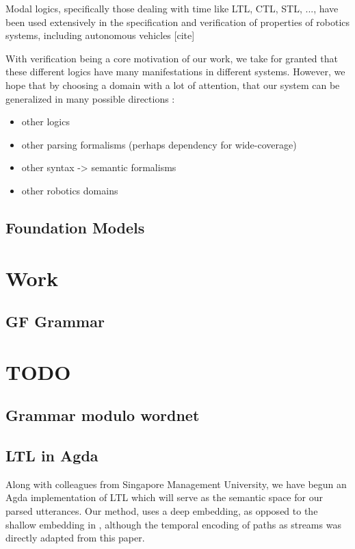 \documentclass[a4paper, 11pt]{article}
\begin{document}
Modal logics, specifically those dealing with time like LTL, CTL, STL, ..., have
been used extensively in the specification and verification of properties of
robotics systems, including autonomous vehicles [cite]

With verification being a core motivation of our work, we take for granted that
these different logics have many manifestations in different systems. However,
we hope that by choosing a domain with a lot of attention, that our system can
be generalized in many possible directions :

\begin{itemize}
\item other logics
\item other parsing formalisms (perhaps dependency for wide-coverage)
\item other syntax -> semantic formalisms
\item other robotics domains
\end{itemize}




\subsection{Foundation Models}

\section{Work} 

\subsection{GF Grammar}

\section{TODO} 

\subsection{Grammar modulo wordnet}

\subsection{LTL in Agda}

Along with colleagues from Singapore Management University, we have begun an
Agda implementation \cite{wltl} of LTL which will serve as the semantic space
for our parsed utterances. Our method, uses a deep embedding, as opposed to the
shallow embedding in \cite{coqLTL}, although the temporal encoding of paths as
streams was directly adapted from this paper.
\end{document}

